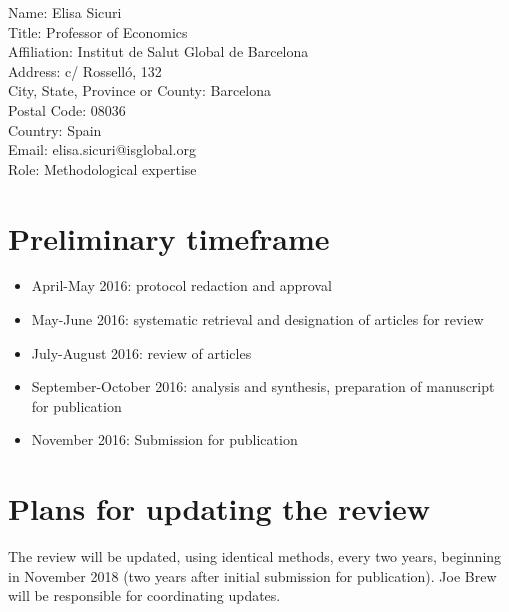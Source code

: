 \documentclass{article}
\begin{document}
\vspace{5mm}

\noindent Name: Elisa Sicuri\\
Title: Professor of Economics\\
Affiliation: Institut de Salut Global de Barcelona\\
Address: c/ Rosselló, 132\\
City, State, Province or County: Barcelona\\
Postal Code: 08036\\
Country: Spain\\
Email: elisa.sicuri@isglobal.org\\
Role: Methodological expertise\\


\section*{Preliminary timeframe}

\begin{itemize}
  \setlength\itemsep{-0.2em}
\item April-May 2016: protocol redaction and approval
\item May-June 2016: systematic retrieval and designation of articles for review
\item July-August 2016: review of articles
\item September-October 2016: analysis and synthesis, preparation of manuscript for publication
\item November 2016: Submission for publication
\end{itemize}

\section*{Plans for updating the review} 

The review will be updated, using identical methods, every two years, beginning in November 2018 (two years after initial submission for publication). Joe Brew will be responsible for coordinating updates.


{}
  
\end{document}
